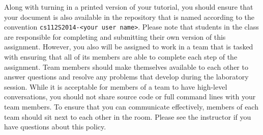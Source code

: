 Along with turning in a printed version of your tutorial, you should ensure that your document is also available in the repository
that is named according to the convention {\tt cs112S2014-<your user name>}. Please note that students in the class are
responsible for completing and submitting their own version of this assignment.  However, you also will be assigned to work in a
team that is tasked with ensuring that all of its members are able to complete each step of the assignment.  Team members should
make themselves available to each other to answer questions and resolve any problems that develop during the laboratory session.
While it is acceptable for members of a team to have high-level conversations, you should not share source code or full command
lines with your team members. To ensure that you can communicate effectively, members of each team should sit next to each other
in the room.  Please see the instructor if you have questions about this policy.


